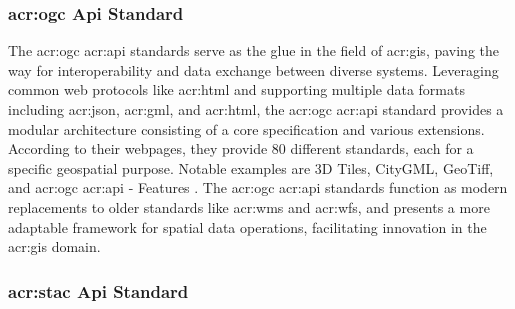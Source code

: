 \subsubsection[OGC Standards]{\acrshort{acr:ogc} Api Standard}\label{subsubsec:ogc}

The \gls{acr:ogc} \acrshort{acr:api} standards serve as the glue in the field of \gls{acr:gis}, paving the way for interoperability and data exchange between diverse systems. Leveraging common web protocols like \acrshort{acr:html} and supporting multiple data formats including \acrshort{acr:json}, \acrshort{acr:gml}, and \acrshort{acr:html}, the \gls{acr:ogc} \acrshort{acr:api} standard provides a modular architecture consisting of a core specification and various extensions. According to their webpages, they provide 80 different standards, each for a specific geospatial purpose. Notable examples are 3D Tiles, CityGML, GeoTiff, and \acrshort{acr:ogc} \acrshort{acr:api} - Features \citep{ogcOGCStandards2023}. The \acrshort{acr:ogc} \acrshort{acr:api} standards function as modern replacements to older standards like \acrshort{acr:wms} and \acrshort{acr:wfs}, and presents a more adaptable framework for spatial data operations, facilitating innovation in the \acrshort{acr:gis} domain.

\subsubsection[STAC Api Standard]{\acrshort{acr:stac} Api Standard}\label{subsubsec:stac}

